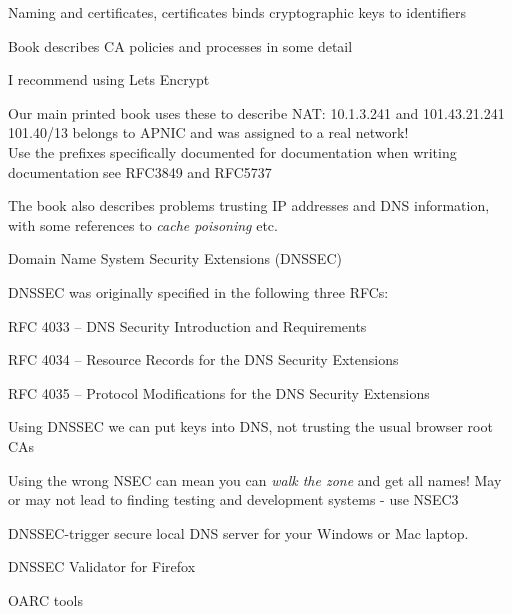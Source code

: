 \documentclass[Screen16to9,17pt]{foils}
\begin{document}

\begin{list1}
\item Naming and certificates, certificates binds cryptographic keys to identifiers
\item Book describes CA policies and processes in some detail
\item I recommend using Lets Encrypt 
\item Our main printed book uses these to describe NAT: 10.1.3.241 and 101.43.21.241\\
101.40/13 belongs to APNIC and was assigned to a real network!\\
Use the prefixes specifically documented for documentation when writing documentation🙏see RFC3849 and RFC5737
\item The book also describes problems trusting IP addresses and DNS information, with some references to \emph{cache poisoning} etc.
\end{list1}

\begin{list1}
\item Domain Name System Security Extensions (DNSSEC)
\item DNSSEC was originally specified in the following three RFCs:
\item RFC 4033 – DNS Security Introduction and Requirements
\item RFC 4034 – Resource Records for the DNS Security Extensions
\item RFC 4035 – Protocol Modifications for the DNS Security Extensions\\
\item Using DNSSEC we can put keys into DNS, not trusting the usual browser root CAs
\item Using the wrong NSEC can mean you can \emph{walk the zone} and get all names! May or may not lead to finding testing and development systems - use NSEC3
\end{list1}




DNSSEC-trigger secure local DNS server for your Windows or Mac laptop.

\begin{list2}
\item DNSSEC Validator for Firefox\\ 
\item OARC tools 
\item {}
\end{list2}
\end{document}
